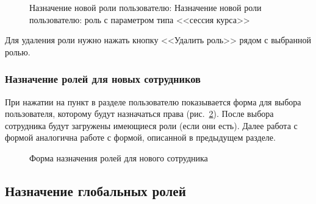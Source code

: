 \begin{figure}[H]
	\caption{Назначение новой роли пользователю: Назначение новой роли пользователю: роль с параметром типа <<сессия курса>>}
	\label{img:employee:session_role}
\end{figure}

Для удаления роли нужно нажать кнопку <<Удалить роль>> рядом с выбранной ролью.


\subsubsection{Назначение ролей для новых сотрудников}

При нажатии на пункт  в разделе  пользователю показывается форма для выбора пользователя,
которому будут назначаться права (рис.~\ref{img:employee:choose_user_form}). После выбора сотрудника будут загружены имеющиеся роли (если они есть).
Далее работа с формой аналогична работе с формой, описанной в предыдущем разделе.

\begin{figure}[H]
	\caption{Форма назначения ролей для нового сотрудника}
	\label{img:employee:choose_user_form}
\end{figure}

\subsection{Назначение глобальных ролей} \label{sec:global_role}


